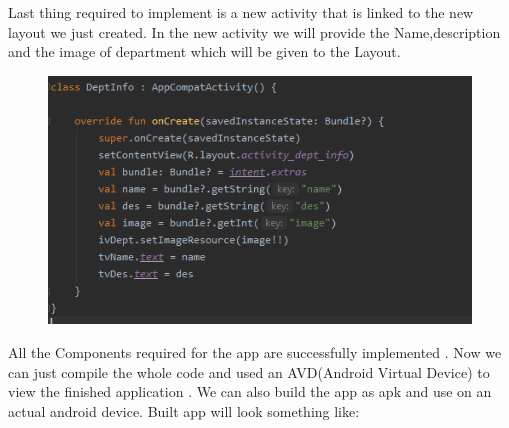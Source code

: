 \documentclass[11pt,a4paper]{report}
\begin{document}
  \vspace{5pt}


  Last thing required to implement is a new activity that is linked to the new layout we just 
  created.
  In the new activity we will provide the Name,description and the image of department which 
  will be given to the Layout.

  \begin{figure}[H]
    \centering
      \includegraphics[scale=0.7]{./img/act.PNG}
    \end{figure}
  
    \vspace{5pt}

  All the Components required for the app are successfully implemented .
  Now we can just compile the whole code and used an AVD(Android Virtual Device)
  to view the finished application . We can also build the app as apk and use on an 
  actual android device. Built app will look something like:
\end{document}
